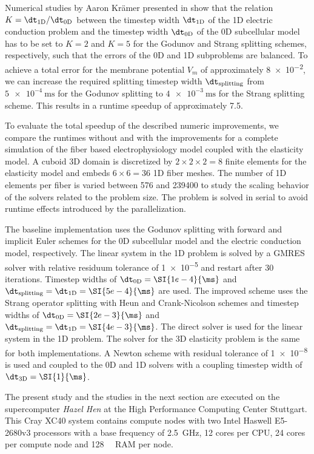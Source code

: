Numerical studies by Aaron Krämer presented in \cite{Bradley:2018:EDB} show that the relation $K=\dt_\text{1D}/\dt_\text{0D}$ between the timestep width $\dt_\text{1D}$ of the 1D electric conduction problem and the timestep width $\dt_\text{0D}$ of the 0D subcellular model has to be set to $K=2$ and $K=5$ for the Godunov and Strang splitting schemes, respectively, such that the errors of the 0D and 1D subproblems are balanced. To achieve a total error for the membrane potential $V_m$ of approximately \num{8e-2}, we can increase the required splitting timestep width $\dt_\text{splitting}$ from $\SI{5e-4}{\ms}$ for the Godunov splitting to $\SI{4e-3}{\ms}$ for the Strang splitting scheme. This results in a runtime speedup  of approximately 7.5.

To evaluate the total speedup of the described numeric improvements, we compare the runtimes without and with the improvements for a complete simulation of the fiber based electrophysiology model coupled with the elasticity model. A cuboid 3D domain is discretized by $2\times 2\times 2=8$ finite elements for the elasticity model and embeds $6\times 6=36$ 1D fiber meshes. The number of 1D elements per fiber is varied between 576 and \num{239400} to study the scaling behavior of the solvers related to the problem size. The problem is solved in serial to avoid runtime effects introduced by the parallelization.

The baseline implementation uses the Godunov splitting with forward and implicit Euler schemes for the 0D subcellular model and the electric conduction model, respectively. The linear system in the 1D problem is solved by a GMRES solver with relative residuum tolerance of \num{1e-5} and restart after 30 iterations. Timestep widths of $\dt_\text{0D}=\SI{1e-4}{\ms}$ and $\dt_\text{splitting}=\dt_\text{1D}=\SI{5e-4}{\ms}$ are used. The improved scheme uses the Strang operator splitting with Heun and Crank-Nicolson schemes and timestep widths of $\dt_\text{0D}=\SI{2e-3}{\ms}$ and $\dt_\text{splitting}=\dt_\text{1D} = \SI{4e-3}{\ms}$. The direct solver is used for the linear system in the 1D problem.
The solver for the 3D elasticity problem is the same for both implementations. A Newton scheme with residual tolerance of \num{1e-8} is used
 and coupled to the 0D and 1D solvers with a coupling timestep width of $\dt_\text{3D}=\SI{1}{\ms}$.

The present study and the studies in the next section are executed on the supercomputer \emph{Hazel Hen} at the High Performance Computing Center Stuttgart. This Cray XC40 system contains compute nodes with two Intel Haswell E5-2680v3 processors with a base frequency of \SI{2.5}{\giga\hertz}, 12 cores per CPU, 24 cores per compute node and \SI{128}{\giga\byte} RAM per node.

